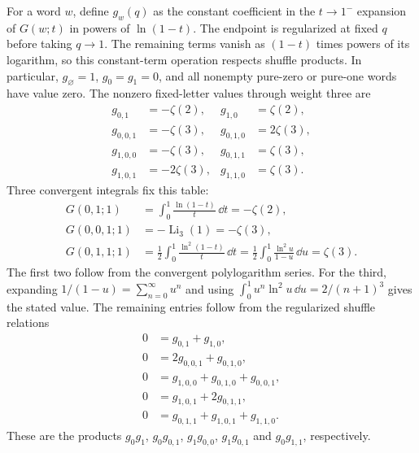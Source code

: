 For a word $w$, define $g_w(q)$ as the constant coefficient in the
$t\to1^-$ expansion of $G(w;t)$ in powers of $\ln(1-t)$.
The endpoint is regularized at fixed $q$ before taking $q\to1$.
The remaining terms vanish as $(1-t)$ times powers of its logarithm,
so this constant-term operation respects shuffle products.
In particular, $g_{\varnothing}=1$, $g_0=g_1=0$, and all nonempty
pure-zero or pure-one words have value zero. The nonzero fixed-letter
values through weight three are
\begin{align}
 g_{0,1}&=-\zeta(2),&g_{1,0}&=\zeta(2),\\
 g_{0,0,1}&=-\zeta(3),&g_{0,1,0}&=2\zeta(3),\\
 g_{1,0,0}&=-\zeta(3),&g_{0,1,1}&=\zeta(3),\\
 g_{1,0,1}&=-2\zeta(3),&g_{1,1,0}&=\zeta(3).
\end{align}
Three convergent integrals fix this table:
\begin{align}
 G(0,1;1)&=\int_0^1\frac{\ln(1-t)}t\,\dd t=-\zeta(2),\\
 G(0,0,1;1)&=-\operatorname{Li}_3(1)=-\zeta(3),\\
 G(0,1,1;1)&=\frac12\int_0^1\frac{\ln^2(1-t)}t\,\dd t
 =\frac12\int_0^1\frac{\ln^2u}{1-u}\,\dd u=\zeta(3).
\end{align}
The first two follow from the convergent polylogarithm series.
For the third, expanding $1/(1-u)=\sum_{n=0}^{\infty}u^n$ and using
$\int_0^1u^n\ln^2u\,\dd u=2/(n+1)^3$ gives the stated value.
The remaining entries follow from the regularized shuffle relations
\begin{align}
 0&=g_{0,1}+g_{1,0},\\
 0&=2g_{0,0,1}+g_{0,1,0},\\
 0&=g_{1,0,0}+g_{0,1,0}+g_{0,0,1},\\
 0&=g_{1,0,1}+2g_{0,1,1},\\
 0&=g_{0,1,1}+g_{1,0,1}+g_{1,1,0}.
\end{align}
These are the products $g_0g_1$, $g_0g_{0,1}$, $g_1g_{0,0}$,
$g_1g_{0,1}$ and $g_0g_{1,1}$, respectively.

